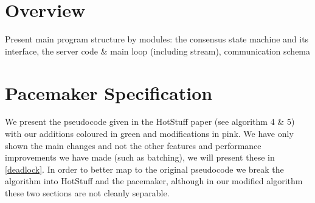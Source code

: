 





\section{Overview}
Present main program structure by modules: the consensus state machine and its interface, the server code \& main loop (including stream), communication schema
\section{Pacemaker Specification}
We present the pseudocode given in the HotStuff paper (see algorithm 4 \& 5) with our additions coloured in green and modifications in pink. We have only shown the main changes and not the other features and performance improvements we have made (such as batching), we will present these in \ref{deadlock}. In order to better map to the original pseudocode we break the algorithm into HotStuff and the pacemaker, although in our modified algorithm these two sections are not cleanly separable.

